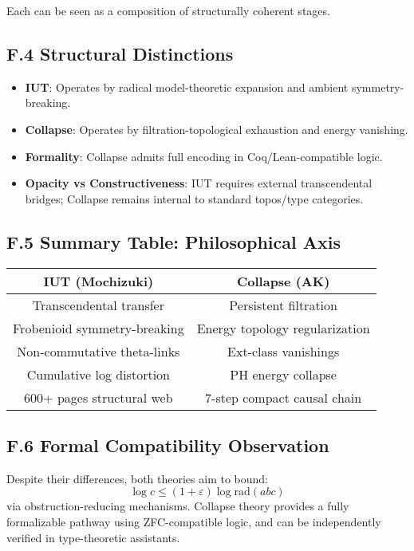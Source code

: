 \documentclass[11pt]{article}
\begin{document}
Each can be seen as a composition of structurally coherent stages.

\subsection*{F.4 Structural Distinctions}

\begin{itemize}
  \item \textbf{IUT}: Operates by radical model-theoretic expansion and ambient symmetry-breaking.
  \item \textbf{Collapse}: Operates by filtration-topological exhaustion and energy vanishing.
  \item \textbf{Formality}: Collapse admits full encoding in Coq/Lean-compatible logic.
  \item \textbf{Opacity vs Constructiveness}: IUT requires external transcendental bridges; Collapse remains internal to standard topos/type categories.
\end{itemize}

\subsection*{F.5 Summary Table: Philosophical Axis}

\begin{tabular}{|c|c|}
\hline
\textbf{IUT (Mochizuki)} & \textbf{Collapse (AK)} \\
\hline
Transcendental transfer & Persistent filtration \\
Frobenioid symmetry-breaking & Energy topology regularization \\
Non-commutative theta-links & Ext-class vanishings \\
Cumulative log distortion & PH energy collapse \\
600+ pages structural web & 7-step compact causal chain \\
\hline
\end{tabular}

\subsection*{F.6 Formal Compatibility Observation}

Despite their differences, both theories aim to bound:
\[
\log c \leq (1 + \varepsilon) \log \mathrm{rad}(abc)
\]
via obstruction-reducing mechanisms. Collapse theory provides a fully formalizable pathway  
using ZFC-compatible logic, and can be independently verified in type-theoretic assistants.
\end{document}

